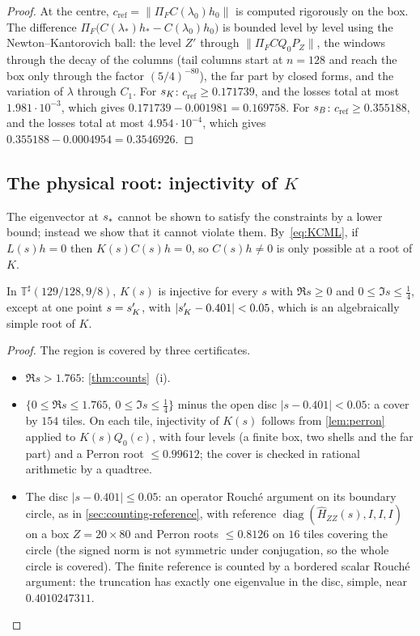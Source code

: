 \begin{proof}
At the centre, $c_{\mathrm{ref}}=\|\Pi_FC(\lambda_0)h_0\|$ is computed rigorously on the box. The difference
$\Pi_F\big(C(\lambda_*)h_*-C(\lambda_0)h_0\big)$ is bounded level by level using the Newton--Kantorovich ball:
the level $Z'$ through $\|\Pi_FCQ_0P_Z\|$, the windows through the decay of the columns (tail columns start at
$n=128$ and reach the box only through the factor $(5/4)^{-80}$), the far part by closed forms, and the variation
of $\lambda$ through $C_1$. For $s_{K}$: $c_{\mathrm{ref}}\ge0.171739$, and the losses total at most $1.981\cdot10^{-3}$, which gives
$0.171739-0.001981=0.169758$. For $s_{B}$: $c_{\mathrm{ref}}\ge0.355188$, and the losses total at most
$4.954\cdot10^{-4}$, which gives $0.355188-0.0004954=0.3546926$.
\end{proof}

\subsection{The physical root: injectivity of $K$}\label{sec:roots-K}

The eigenvector at $s_{\ast}$ cannot be shown to satisfy the constraints by a lower bound; instead we show that it
cannot violate them. By~\eqref{eq:KCML}, if $L(s)h=0$ then $K(s)C(s)h=0$, so $C(s)h\neq0$ is only possible at a
root of $K$.

\begin{proposition}[Injectivity of $K$]\label{prop:Kinj}
In $\mathbb T^\sharp(129/128,9/8)$, $K(s)$ is injective for every $s$ with $\Re s\ge0$ and $0\le\Im s\le\tfrac14$,
except at one point $s=s_{K}'$, with $|s_{K}'-0.401|<0.05$, which is an algebraically simple root of $K$.
\end{proposition}

\begin{proof}
The region is covered by three certificates.
\begin{itemize}[leftmargin=*]
\item $\Re s>1.765$: \cref{thm:counts}~(i).
\item $\{0\le\Re s\le1.765,\ 0\le\Im s\le\tfrac14\}$ minus the open disc $|s-0.401|<0.05$: a cover by $154$
  tiles. On each tile, injectivity of $K(s)$ follows from \cref{lem:perron} applied to $K(s)Q_0(c)$, with four
  levels (a finite box, two shells and the far part) and a Perron root $\le0.99612$; the cover is checked in rational
  arithmetic by a quadtree.
\item The disc $|s-0.401|\le0.05$: an operator Rouch\'e argument on its boundary circle, as in
  \cref{sec:counting-reference}, with reference $\operatorname{diag}(\widehat H_{ZZ}(s),I,I,I)$ on a box
  $Z=20\times80$ and Perron roots $\le0.8126$ on $16$ tiles covering the circle (the signed norm is not symmetric
  under conjugation, so the whole circle is covered). The finite reference is counted by a bordered scalar
  Rouch\'e argument: the truncation has exactly one eigenvalue in the disc, simple, near $0.4010247311$.
\end{itemize}
\end{proof}

